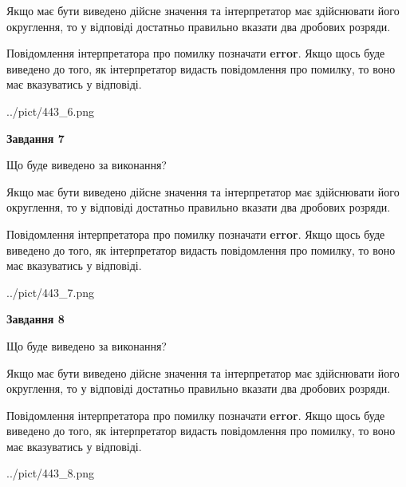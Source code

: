 \documentclass[12pt, ukrainian]{article}
\begin{document}
{\begin {Large}
Якщо має бути виведено дійсне значення та інтерпретатор має здійснювати його округлення, 
то у відповіді достатньо правильно вказати два дробових розряди.

Повідомлення інтерпретатора про помилку позначати \textbf{error}.
Якщо щось буде виведено до того, як інтерпретатор видасть повідомлення про помилку, 
то воно має вказуватись у відповіді. \par

\begin{center}
	{../pict/443_6.png}
\end{center}
\newpage

{\begin {center}\textbf{Завдання 7}\end {center}}\par
Що буде виведено за виконання? \par

Якщо має бути виведено дійсне значення та інтерпретатор має здійснювати його округлення, 
то у відповіді достатньо правильно вказати два дробових розряди.

Повідомлення інтерпретатора про помилку позначати \textbf{error}.
Якщо щось буде виведено до того, як інтерпретатор видасть повідомлення про помилку, 
то воно має вказуватись у відповіді. \par

\begin{center}
	{../pict/443_7.png}
\end{center}
\newpage

{\begin {center}\textbf{Завдання 8}\end {center}}\par
Що буде виведено за виконання? \par

Якщо має бути виведено дійсне значення та інтерпретатор має здійснювати його округлення, 
то у відповіді достатньо правильно вказати два дробових розряди.

Повідомлення інтерпретатора про помилку позначати \textbf{error}.
Якщо щось буде виведено до того, як інтерпретатор видасть повідомлення про помилку, 
то воно має вказуватись у відповіді. \par

\begin{center}
	{../pict/443_8.png}
\end{center}
\newpage


\end{Large}}
\end{document}

